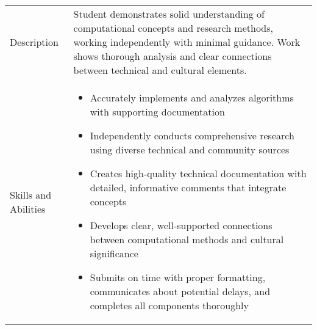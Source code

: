 \documentclass[12pt]{article}
\begin{document}
\begin{table}[t]
\renewcommand{\arraystretch}{1.5}
\begin{tabular}{>{\raggedright\arraybackslash}p{2cm}|>{\raggedright\arraybackslash}p{14cm}}
\toprule
\multicolumn{2}{l}{\textbf{Proficient}} \\
\midrule
Description & Student demonstrates solid understanding of computational concepts and research methods, working independently with minimal guidance. Work shows thorough analysis and clear connections between technical and cultural elements. \\
\midrule
Skills and Abilities & 
\begin{itemize}
    \item Accurately implements and analyzes algorithms with supporting documentation
    \item Independently conducts comprehensive research using diverse technical and community sources
    \item Creates high-quality technical documentation with detailed, informative comments that integrate concepts
    \item Develops clear, well-supported connections between computational methods and cultural significance
    \item Submits on time with proper formatting, communicates about potential delays, and completes all components thoroughly
\end{itemize} \\
\bottomrule
\end{tabular}
\end{table}
\end{document}

